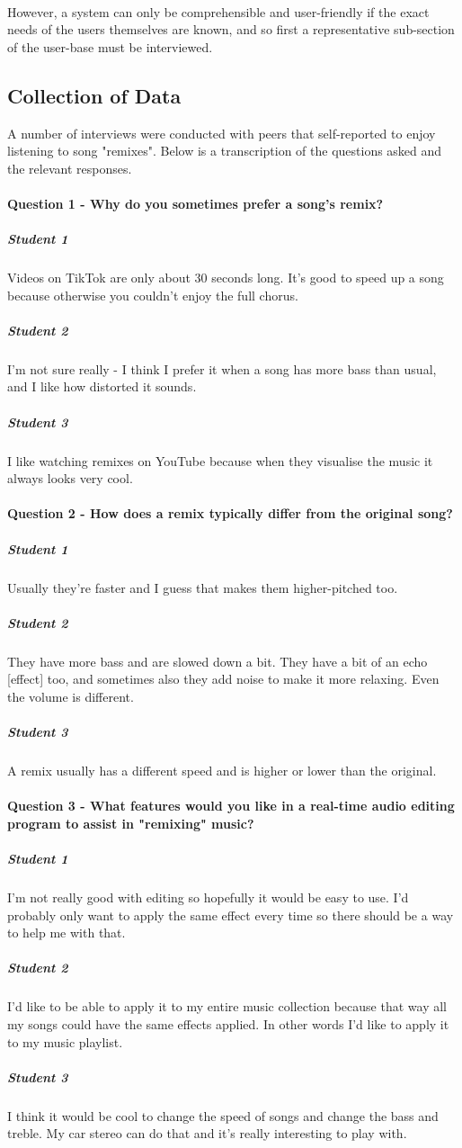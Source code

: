 \documentclass{article}
\begin{document}
	\paragraph{}
	However, a system can only be comprehensible and user-friendly if the exact needs of the users themselves are known, and so first a representative sub-section of the user-base must be interviewed.
	
	\subsection{Collection of Data}
	A number of interviews were conducted with peers that self-reported to enjoy listening to song "remixes". Below is a transcription of the questions asked and the relevant responses.
	
	\paragraph{Question 1 - Why do you sometimes prefer a song's remix?}
	\subparagraph{Student 1}
	Videos on TikTok are only about 30 seconds long. It's good to speed up a song because otherwise you couldn't enjoy the full chorus.
	\subparagraph{Student 2}
	I'm not sure really - I think I prefer it when a song has more bass than usual, and I like how distorted it sounds.
	\subparagraph{Student 3}
	I like watching remixes on YouTube because when they visualise the music it always looks very cool.
	
	\paragraph{Question 2 - How does a remix typically differ from the original song?}
	\subparagraph{Student 1}
	Usually they're faster and I guess that makes them higher-pitched too.
	\subparagraph{Student 2}
	They have more bass and are slowed down a bit. They have a bit of an echo {[effect]} too, and sometimes also they add noise to make it more relaxing. Even the volume is different.
	\subparagraph{Student 3}
	A remix usually has a different speed and is higher or lower than the original.
	
	\paragraph{Question 3 - What features would you like in a real-time audio editing program to assist in "remixing" music?}
	\subparagraph{Student 1}
	I'm not really good with editing so hopefully it would be easy to use. I'd probably only want to apply the same effect every time so there should be a way to help me with that.
	\subparagraph{Student 2}
	I'd like to be able to apply it to my entire music collection because that way all my songs could have the same effects applied. In other words I'd like to apply it to my music playlist.
	\subparagraph{Student 3}
	I think it would be cool to change the speed of songs and change the bass and treble. My car stereo can do that and it's really interesting to play with.
\end{document}
